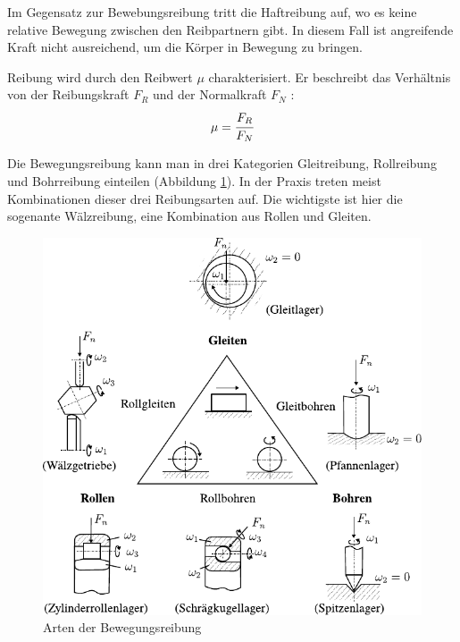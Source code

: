 Im Gegensatz zur Bewebungsreibung tritt die Haftreibung auf, wo es keine relative Bewegung zwischen den Reibpartnern gibt.
In diesem Fall ist angreifende Kraft nicht ausreichend, um die Körper in Bewegung zu bringen.

Reibung wird durch den Reibwert $\mu$ charakterisiert.
Er beschreibt das Verhältnis von der Reibungskraft $F_R$ und der Normalkraft $F_N$ \cite{reibung}:
\begin{equation}
    \label{eq:reibung}
	\mu = \cfrac{F_R}{F_N}
\end{equation}
%

Die Bewegungsreibung kann man in drei Kategorien Gleitreibung, Rollreibung und Bohrreibung einteilen (Abbildung \ref{fig:arten_der_bewegungsreibung}).
In der Praxis treten meist Kombinationen dieser drei Reibungsarten auf.
Die wichtigste ist hier die sogenante Wälzreibung, eine Kombination aus Rollen und Gleiten.
\begin{figure}[htb]
    \centering
    \includegraphics[]{./images/bewegungsarten.pdf}
    \caption{Arten der Bewegungsreibung \cite{steinhilper_2008}}
    \label{fig:arten_der_bewegungsreibung}
\end{figure}
%

